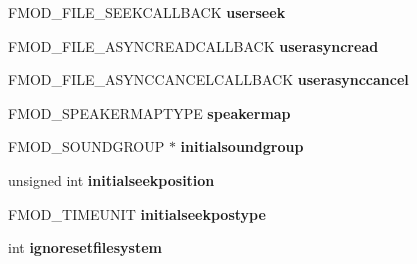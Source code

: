\begin{DoxyCompactItemize}
\item 
\hypertarget{struct_f_m_o_d___c_r_e_a_t_e_s_o_u_n_d_e_x_i_n_f_o_a9063a97ac9de132f8ff2ba7048670e1c}{F\-M\-O\-D\-\_\-\-F\-I\-L\-E\-\_\-\-S\-E\-E\-K\-C\-A\-L\-L\-B\-A\-C\-K {\bfseries userseek}}\label{struct_f_m_o_d___c_r_e_a_t_e_s_o_u_n_d_e_x_i_n_f_o_a9063a97ac9de132f8ff2ba7048670e1c}

\item 
\hypertarget{struct_f_m_o_d___c_r_e_a_t_e_s_o_u_n_d_e_x_i_n_f_o_a4d0dd8153d5191e550b8a8ef6123d737}{F\-M\-O\-D\-\_\-\-F\-I\-L\-E\-\_\-\-A\-S\-Y\-N\-C\-R\-E\-A\-D\-C\-A\-L\-L\-B\-A\-C\-K {\bfseries userasyncread}}\label{struct_f_m_o_d___c_r_e_a_t_e_s_o_u_n_d_e_x_i_n_f_o_a4d0dd8153d5191e550b8a8ef6123d737}

\item 
\hypertarget{struct_f_m_o_d___c_r_e_a_t_e_s_o_u_n_d_e_x_i_n_f_o_a6cf94db240477e76107573b5e4f69ed8}{F\-M\-O\-D\-\_\-\-F\-I\-L\-E\-\_\-\-A\-S\-Y\-N\-C\-C\-A\-N\-C\-E\-L\-C\-A\-L\-L\-B\-A\-C\-K {\bfseries userasynccancel}}\label{struct_f_m_o_d___c_r_e_a_t_e_s_o_u_n_d_e_x_i_n_f_o_a6cf94db240477e76107573b5e4f69ed8}

\item 
\hypertarget{struct_f_m_o_d___c_r_e_a_t_e_s_o_u_n_d_e_x_i_n_f_o_a4a2100eaf35bb354cff5875811450006}{F\-M\-O\-D\-\_\-\-S\-P\-E\-A\-K\-E\-R\-M\-A\-P\-T\-Y\-P\-E {\bfseries speakermap}}\label{struct_f_m_o_d___c_r_e_a_t_e_s_o_u_n_d_e_x_i_n_f_o_a4a2100eaf35bb354cff5875811450006}

\item 
\hypertarget{struct_f_m_o_d___c_r_e_a_t_e_s_o_u_n_d_e_x_i_n_f_o_a680f5786a4a73c4ce3efd244aab1aeba}{F\-M\-O\-D\-\_\-\-S\-O\-U\-N\-D\-G\-R\-O\-U\-P $\ast$ {\bfseries initialsoundgroup}}\label{struct_f_m_o_d___c_r_e_a_t_e_s_o_u_n_d_e_x_i_n_f_o_a680f5786a4a73c4ce3efd244aab1aeba}

\item 
\hypertarget{struct_f_m_o_d___c_r_e_a_t_e_s_o_u_n_d_e_x_i_n_f_o_abd2577182ac908d6af88d4610470e68c}{unsigned int {\bfseries initialseekposition}}\label{struct_f_m_o_d___c_r_e_a_t_e_s_o_u_n_d_e_x_i_n_f_o_abd2577182ac908d6af88d4610470e68c}

\item 
\hypertarget{struct_f_m_o_d___c_r_e_a_t_e_s_o_u_n_d_e_x_i_n_f_o_acb1b8eee3ee0a85e91dbb7a88a74d574}{F\-M\-O\-D\-\_\-\-T\-I\-M\-E\-U\-N\-I\-T {\bfseries initialseekpostype}}\label{struct_f_m_o_d___c_r_e_a_t_e_s_o_u_n_d_e_x_i_n_f_o_acb1b8eee3ee0a85e91dbb7a88a74d574}

\item 
\hypertarget{struct_f_m_o_d___c_r_e_a_t_e_s_o_u_n_d_e_x_i_n_f_o_a6bbfa77595d2a222ab5b51c8163015f9}{int {\bfseries ignoresetfilesystem}}\label{struct_f_m_o_d___c_r_e_a_t_e_s_o_u_n_d_e_x_i_n_f_o_a6bbfa77595d2a222ab5b51c8163015f9}


\end{DoxyCompactItemize}
